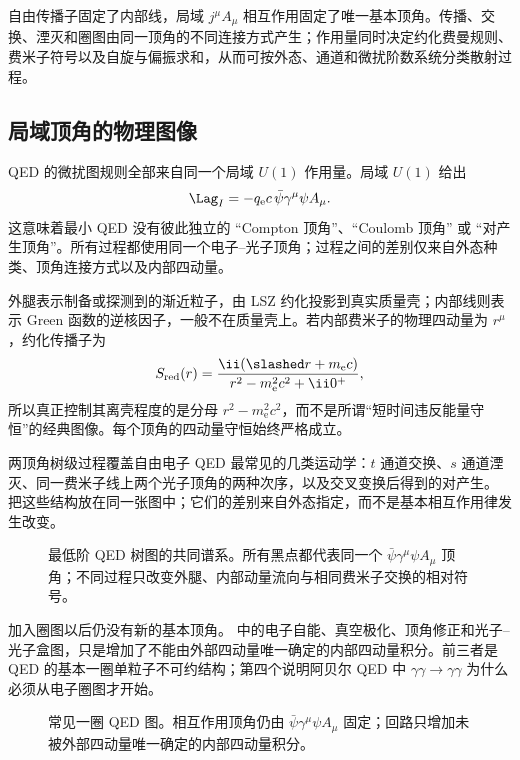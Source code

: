 自由传播子固定了内部线，局域 $j^\mu A_\mu$ 相互作用固定了唯一基本顶角。传播、交换、湮灭和圈图由同一顶角的不同连接方式产生；作用量同时决定约化费曼规则、费米子符号以及自旋与偏振求和，从而可按外态、通道和微扰阶数系统分类散射过程。

\subsection{局域顶角的物理图像}

QED 的微扰图规则全部来自同一个局域 $U(1)$ 作用量。局域 $U(1)$ 给出
\begin{equation}
 \Lag_I=-q_{\mathrm e} c\,\bar\psi\gamma^\mu\psi A_\mu .
 \label{eq:qed-one-vertex-mainline-dp7}
\end{equation}
这意味着最小 QED 没有彼此独立的 ``Compton 顶角''、``Coulomb 顶角'' 或 ``对产生顶角''。所有过程都使用同一个电子--光子顶角；过程之间的差别仅来自外态种类、顶角连接方式以及内部四动量。

外腿表示制备或探测到的渐近粒子，由 LSZ 约化投影到真实质量壳；内部线则表示 Green 函数的逆核因子，一般不在质量壳上。若内部费米子的物理四动量为 $r^\mu$，约化传播子为
\begin{equation*}
 S_{\rm red}(r)
 =\frac{\ii(\slashed r+m_{\mathrm e} c)}{r^2-m_{\mathrm e}^2c^2+\ii0^+},
\end{equation*}
所以真正控制其离壳程度的是分母 $r^2-m_{\mathrm e}^2c^2$，而不是所谓“短时间违反能量守恒”的经典图像。每个顶角的四动量守恒始终严格成立。

两顶角树级过程覆盖自由电子 QED 最常见的几类运动学：$t$ 通道交换、$s$ 通道湮灭、同一费米子线上两个光子顶角的两种次序，以及交叉变换后得到的对产生。 把这些结构放在同一张图中；它们的差别来自外态指定，而不是基本相互作用律发生改变。

\begin{figure}[htbp]
 \centering
 
 \caption{最低阶 QED 树图的共同谱系。所有黑点都代表同一个 $\bar\psi\gamma^\mu\psi A_\mu$ 顶角；不同过程只改变外腿、内部动量流向与相同费米子交换的相对符号。}
 \label{fig:qed-tree-atlas-dp7}
\end{figure}

加入圈图以后仍没有新的基本顶角。 中的电子自能、真空极化、顶角修正和光子--光子盒图，只是增加了不能由外部四动量唯一确定的内部四动量积分。前三者是 QED 的基本一圈单粒子不可约结构；第四个说明阿贝尔 QED 中 $\gamma\gamma\to\gamma\gamma$ 为什么必须从电子圈图才开始。

\begin{figure}[htbp]
 \centering
 
 \caption{常见一圈 QED 图。相互作用顶角仍由 $\bar\psi\gamma^\mu\psi A_\mu$ 固定；回路只增加未被外部四动量唯一确定的内部四动量积分。}
 \label{fig:qed-loop-atlas-dp7}
\end{figure}

